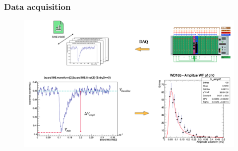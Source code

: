 \begin{frame} [fragile]
    \small
        \frametitle{Data acquisition}
                \begin{figure}
             \centering
                \includegraphics[scale=0.25]{figures/root_file.png}
            \end{figure} 
    \end{frame}
